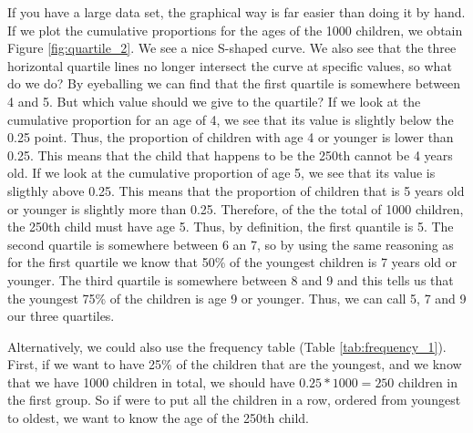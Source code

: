 \begin{kframe}


{\ttfamily\noindent\bfseries{}}\end{kframe}

If you have a large data set, the graphical way is far easier than doing it by hand. If we plot the cumulative proportions for the ages of the 1000 children, we obtain Figure \ref{fig:quartile_2}. We see a nice S-shaped curve. We also see that the three horizontal quartile lines no longer intersect the curve at specific values, so what do we do? By eyeballing we can find that the first quartile is somewhere between 4 and 5. But which value should we give to the quartile? If we look at the cumulative proportion for an age of 4, we see that its value is slightly below the 0.25 point. Thus, the proportion of children with age 4 or younger is lower than 0.25. This means that the child that happens to be the 250th cannot be 4 years old. If we look at the cumulative proportion of age 5, we see that its value is sligthly above 0.25. This means that the proportion of children that is 5 years old or younger is slightly more than 0.25. Therefore, of the the total of 1000 children, the 250th child must have age 5. Thus, by definition, the first quantile is 5. 
The second quartile is somewhere between 6 an 7, so by using the same reasoning as for the first quartile we know that 50\% of the youngest children is 7 years old or younger. The third quartile is somewhere between 8 and 9 and this tells us that the youngest 75\% of the children is age 9 or younger. Thus, we can call 5, 7 and 9 our three quartiles.



\begin{kframe}


{\ttfamily\noindent\bfseries{}}\end{kframe}


Alternatively, we could also use the frequency table (Table \ref{tab:frequency_1}). First, if we want to have 25\% of the children that are the youngest, and we know that we have 1000 children in total, we should have $0.25 * 1000=250$ children in the first group. So if were to put all the children in a row, ordered from youngest to oldest, we want to know the age of the 250th child.

